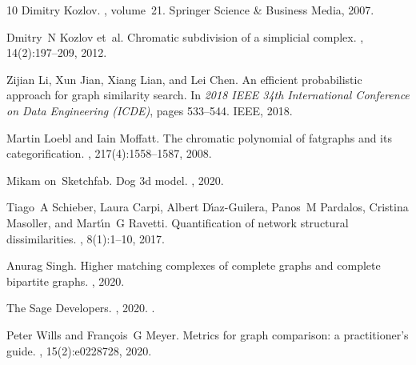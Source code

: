 \documentclass[11pt, a4paper, reqno, twoside, makeidx]{amsart}
\theoremstyle{remark}
\theoremstyle{plain}
\theoremstyle{definition}
\begin{document}
\begin{thebibliography}{10}
Dimitry Kozlov.
, volume~21.
\newblock Springer Science \& Business Media, 2007.

Dmitry~N Kozlov et~al.
\newblock Chromatic subdivision of a simplicial complex.
, 14(2):197--209, 2012.

Zijian Li, Xun Jian, Xiang Lian, and Lei Chen.
\newblock An efficient probabilistic approach for graph similarity search.
\newblock In {\em 2018 IEEE 34th International Conference on Data Engineering
  (ICDE)}, pages 533--544. IEEE, 2018.

Martin Loebl and Iain Moffatt.
\newblock The chromatic polynomial of fatgraphs and its categorification.
, 217(4):1558--1587, 2008.

Mikam on~Sketchfab.
\newblock Dog 3d model.
, 2020.

Tiago~A Schieber, Laura Carpi, Albert D{\'\i}az-Guilera, Panos~M Pardalos,
  Cristina Masoller, and Mart{\'\i}n~G Ravetti.
\newblock Quantification of network structural dissimilarities.
, 8(1):1--10, 2017.

Anurag Singh.
\newblock Higher matching complexes of complete graphs and complete bipartite
  graphs.
, 2020.

{The Sage Developers}.
, 2020.
.

Peter Wills and Fran{\c{c}}ois~G Meyer.
\newblock Metrics for graph comparison: a practitioner’s guide.
, 15(2):e0228728, 2020.

\end{thebibliography}
\end{document}
